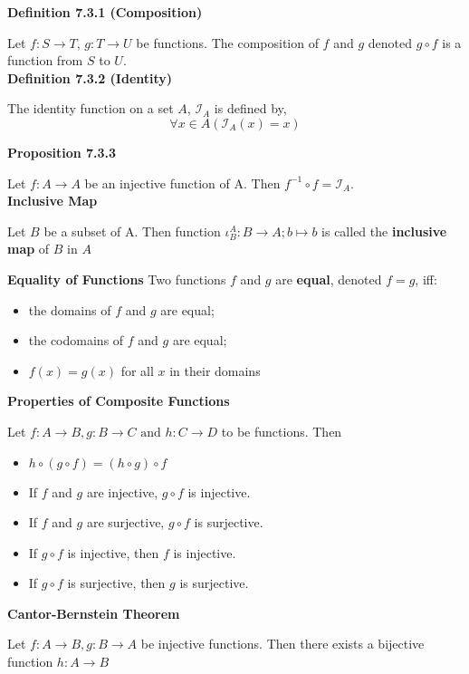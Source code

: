 \documentclass[a4paper]{article}
\newcommand{\subheading}[1]{{\scriptsize\textbf{#1}}}
\begin{document}
\begin{multicols*}{4}
\subheading{Definition 7.3.1 (Composition)}

Let $f : S \rightarrow T$, $g: T \rightarrow U$ be functions. The composition of
$f$ and $g$ denoted $g \circ f$ is a function from $S$ to $U$.\\

\subheading{Definition 7.3.2 (Identity)}

The identity function on a set $A$, $\mathcal{I}_A$ is defined by,
$$\forall x \in A(\mathcal{I}_A(x) = x)$$

\subheading{Proposition 7.3.3}

Let $f : A \rightarrow A$ be an injective function of A. Then $f^{-1} \circ f =
\mathcal{I}_A$.\\

\subheading{Inclusive Map}

Let $B$ be a subset of A. Then function $\iota^A_B: B \rightarrow A; b \mapsto b$ is called the \textbf{inclusive map} of $B$ in $A$

\subheading{Equality of Functions}
Two functions $f$ and $g$ are \textbf{equal}, denoted $f = g$, iff:
\begin{itemize}
	\item the domains of $f$ and $g$ are equal;
	\item the codomains of $f$ and $g$ are equal;
	\item $f(x) = g(x)$ for all $x$ in their domains
\end{itemize}

\subheading{Properties of Composite Functions}

Let $f: A \rightarrow B, g: B \rightarrow C \text{ and } h: C \rightarrow D$ to be functions. Then
\begin{itemize}
	\item $h \circ (g \circ f) = (h \circ g) \circ f$
	\item If $f$ and $g$ are injective, $g \circ f$ is injective.
	\item If $f$ and $g$ are surjective, $g \circ f$ is surjective.
	\item If $g \circ f$ is injective, then $f$ is injective.
	\item If $g \circ f$ is surjective, then $g$ is surjective.
\end{itemize}

\subheading{Cantor-Bernstein Theorem}

Let  $f: A \rightarrow B, g: B \rightarrow A$ be injective functions. Then there exists a bijective function $h: A \rightarrow B$


\end{multicols*}
\end{document}
